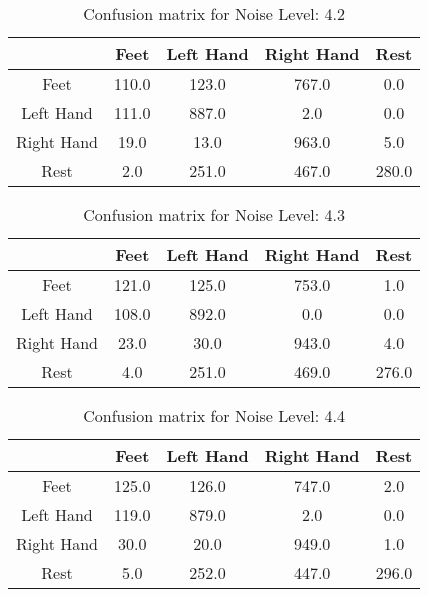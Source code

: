 \begin{table}[!htbp]
    \centering
    \begin{tabular}{|c||c|c|c|c|}
        \hline
		 & Feet & Left Hand & Right Hand & Rest \\
        \hline
        \hline
        Feet & 110.0 & 123.0 & 767.0 & 0.0 \\
        \hline
        Left Hand & 111.0 & 887.0 & 2.0 & 0.0 \\
        \hline
        Right Hand & 19.0 & 13.0 & 963.0 & 5.0 \\
        \hline
        Rest & 2.0 & 251.0 & 467.0 & 280.0 \\
        \hline
    \end{tabular}
    \caption{Confusion matrix for Noise Level: 4.2}
\end{table}

\begin{table}[!htbp]
    \centering
    \begin{tabular}{|c||c|c|c|c|}
        \hline
		 & Feet & Left Hand & Right Hand & Rest \\
        \hline
        \hline
        Feet & 121.0 & 125.0 & 753.0 & 1.0 \\
        \hline
        Left Hand & 108.0 & 892.0 & 0.0 & 0.0 \\
        \hline
        Right Hand & 23.0 & 30.0 & 943.0 & 4.0 \\
        \hline
        Rest & 4.0 & 251.0 & 469.0 & 276.0 \\
        \hline
    \end{tabular}
    \caption{Confusion matrix for Noise Level: 4.3}
\end{table}

\begin{table}[!htbp]
    \centering
    \begin{tabular}{|c||c|c|c|c|}
        \hline
		 & Feet & Left Hand & Right Hand & Rest \\
        \hline
        \hline
        Feet & 125.0 & 126.0 & 747.0 & 2.0 \\
        \hline
        Left Hand & 119.0 & 879.0 & 2.0 & 0.0 \\
        \hline
        Right Hand & 30.0 & 20.0 & 949.0 & 1.0 \\
        \hline
        Rest & 5.0 & 252.0 & 447.0 & 296.0 \\
        \hline
    \end{tabular}
    \caption{Confusion matrix for Noise Level: 4.4}
\end{table}

